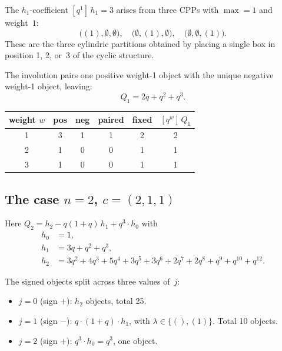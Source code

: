\documentclass[11pt]{article}
\begin{document}
The $h_1$-coefficient $[q^1]\,h_1 = 3$ arises from three CPPs with
$\max = 1$ and weight~$1$:
\begin{equation}
  \label{eq:weight1-cpps}
  \bigl((1), \emptyset, \emptyset\bigr), \quad
  \bigl(\emptyset, (1), \emptyset\bigr), \quad
  \bigl(\emptyset, \emptyset, (1)\bigr).
\end{equation}
These are the three cylindric partitions obtained by placing a single box
in position 1, 2, or~3 of the cyclic structure.

The involution pairs one positive weight-1 object with the unique negative
weight-1 object, leaving:
\[
  Q_1 = 2q + q^2 + q^3.
\]

\begin{center}
\begin{tabular}{c|ccccc}
weight $w$ & pos & neg & paired & fixed & $[q^w]\,Q_1$ \\
\hline
1 & 3 & 1 & 1 & 2 & 2 \\
2 & 1 & 0 & 0 & 1 & 1 \\
3 & 1 & 0 & 0 & 1 & 1
\end{tabular}
\end{center}

\subsection{The case $n = 2$, $c = (2,1,1)$}

Here $Q_2 = h_2 - q(1+q)\,h_1 + q^3 \cdot h_0$ with
\begin{align*}
  h_0 &= 1, \\
  h_1 &= 3q + q^2 + q^3, \\
  h_2 &= 3q^2 + 4q^3 + 5q^4 + 3q^5 + 3q^6 + 2q^7 + 2q^8 + q^9 + q^{10} + q^{12}.
\end{align*}

The signed objects split across three values of~$j$:
\begin{itemize}
  \item $j = 0$ (sign $+$): $h_2$ objects, total 25.
  \item $j = 1$ (sign $-$): $q \cdot (1+q) \cdot h_1$, with
    $\lambda \in \{(), (1)\}$. Total 10 objects.
  \item $j = 2$ (sign $+$): $q^3 \cdot h_0 = q^3$, one object.
\end{itemize}
\end{document}
